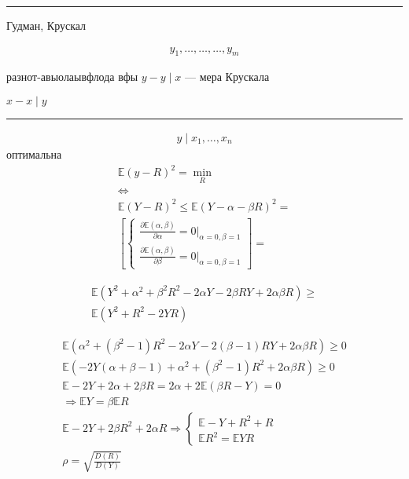 \documentclass{book}
\begin{document}
\hrule

Гудман, Крускал

\begin{gather*}
  y_1,\dots,\dots,\dots,y_m
\end{gather*}

разнот-авыолаывфлода вфы $y-y\mid x$ --- мера Крускала

$x-x\mid y$

\hrule

\begin{gather*}
  y\mid x_1, \dots, x_n
\end{gather*}
оптимальна
\begin{gather*}
    \mathbb{E}(y-R)^2=\min_R\\
    \Leftrightarrow\\
    \mathbb{E}(Y-R)^2\leq \mathbb{E}(Y-\alpha-\beta R)^2=\\
    \left[\begin{cases}
            \frac{\partial \mathbb{E}(\alpha, \beta)}{\partial \alpha}=0\Big|_{\alpha=0,\beta=1}\\
            \frac{\partial \mathbb{E}(\alpha, \beta)}{\partial \beta}=0\Big|_{\alpha=0,\beta=1}
    \end{cases}\right]=
\end{gather*}

\begin{gather*}
  \mathbb{E}(Y^2+\alpha^2+\beta^2 R^2-2\alpha Y - 2\beta RY+2\alpha\beta R)\geq\\
  \mathbb{E}(Y^2+R^2-2YR)
\end{gather*}

\begin{gather*}
  \mathbb{E}(\alpha^2+(\beta^2-1)R^2-2\alpha Y - 2(\beta-1)RY+2\alpha\beta R) \geq 0\\
  \mathbb{E}(-2Y(\alpha+\beta-1)+\alpha^2+(\beta^2-1)R^2+2\alpha\beta R)\geq 0\\
  \mathbb{E}-2Y+2\alpha+2\beta R = 2\alpha + 2 \mathbb{E}(\beta R - Y) = 0\\
  \Rightarrow \mathbb{E}Y=\beta \mathbb{E}R\\
  \mathbb{E}-2Y+2\beta R^2+2\alpha R \Rightarrow
  \begin{cases}
      \mathbb{E}-Y+R^2+R\\
      \mathbb{E}R^2=\mathbb{E}YR
  \end{cases}\\
  \rho=\sqrt{\frac{D(R)}{D(Y)}}
\end{gather*}
\end{document}
